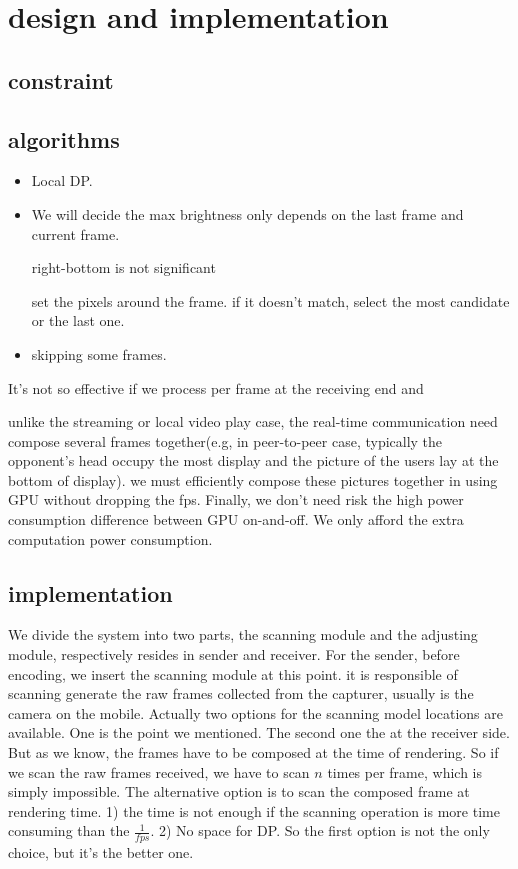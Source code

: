 \section{design and implementation}
\subsection{constraint}

\subsection{algorithms}
\begin{itemize}
  \item
    {
      Local DP.
    }
  \item
    {
      We will decide the max brightness only depends on the last frame
      and current frame.

      right-bottom is not significant

      set the pixels around the frame. if it doesn't match, select the
      most candidate or the last one. 
    }
  \item
    {
      skipping some frames.
    }
\end{itemize}

It's not so effective if we process per frame at the receiving end and

unlike the streaming or local video play case, the real-time
communication need compose several frames together(e.g, in
peer-to-peer case, typically the opponent's head occupy the most
display and the picture of the users lay at the bottom of display).
we must efficiently compose these pictures together in using GPU
without dropping the fps. Finally, we don't need risk the high power
consumption difference between GPU on-and-off. We only afford the
extra computation power consumption.

\subsection{implementation}

We divide the system into two parts, the scanning module and the
adjusting module, respectively resides in sender and receiver. For the
sender, before encoding, we insert the scanning module at this
point. it is responsible of scanning generate the raw frames collected
from the capturer, usually is the camera on the mobile. Actually two
options for the scanning model locations are available. One is the
point we mentioned. The second one the at the receiver side. But as we
know, the frames have to be composed at the time of rendering. So if
we scan the raw frames received, we have to scan $n$ times per frame,
which is simply impossible. The alternative option is to scan the
composed frame at rendering time. 1) the time is not enough if the
scanning operation is more time consuming than the $\frac{1}{fps}$. 2)
No space for DP. So the first option is not the only choice, but it's
the better one. 

